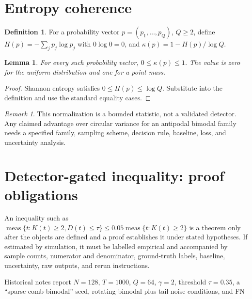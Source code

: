\documentclass[11pt]{article}
\newtheorem{lemma}[theorem]{Lemma}
\theoremstyle{definition}\newtheorem{definition}[theorem]{Definition}
\theoremstyle{remark}\newtheorem{remark}[theorem]{Remark}
\begin{document}
\section{Entropy coherence}
\begin{definition}For a probability vector $p=(p_1,\ldots,p_Q)$, $Q\ge2$, define $H(p)=-\sum_jp_j\log p_j$ with $0\log0=0$, and $\kappa(p)=1-H(p)/\log Q$.\end{definition}
\begin{lemma}For every such probability vector, $0\le\kappa(p)\le1$. The value is zero for the uniform distribution and one for a point mass.\end{lemma}
\begin{proof}Shannon entropy satisfies $0\le H(p)\le\log Q$. Substitute into the definition and use the standard equality cases.\end{proof}
\begin{remark}This normalization is a bounded statistic, not a validated detector. Any claimed advantage over circular variance for an antipodal bimodal family needs a specified family, sampling scheme, decision rule, baseline, loss, and uncertainty analysis.\end{remark}
\section{Detector-gated inequality: proof obligations}
An inequality such as $\operatorname{meas}\{t:K(t)\ge2, D(t)\le\tau\}\le0.05\operatorname{meas}\{t:K(t)\ge2\}$ is a theorem only after the objects are defined and a proof establishes it under stated hypotheses. If estimated by simulation, it must be labelled empirical and accompanied by sample counts, numerator and denominator, ground-truth labels, baseline, uncertainty, raw outputs, and rerun instructions.

Historical notes report $N=128$, $T=1000$, $Q=64$, $\gamma=2$, threshold $\tau=0.35$, a ``sparse-comb-bimodal'' seed, rotating-bimodal plus tail-noise conditions, and FN%
\end{document}
